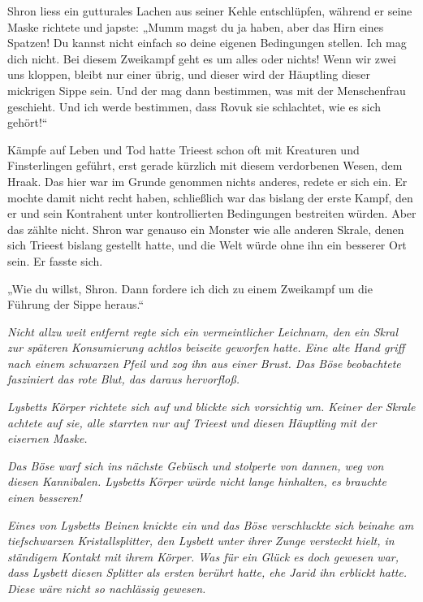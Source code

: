 Shron liess ein gutturales Lachen aus seiner Kehle entschlüpfen, während er seine Maske richtete und japste: „Mumm magst du ja haben, aber das Hirn eines Spatzen! Du kannst nicht einfach so deine eigenen Bedingungen stellen. Ich mag dich nicht. Bei diesem Zweikampf geht es um alles oder nichts! Wenn wir zwei uns kloppen, bleibt nur einer übrig, und dieser wird der Häuptling dieser mickrigen Sippe sein. Und der mag dann bestimmen, was mit der Menschenfrau geschieht. Und ich werde bestimmen, dass Rovuk sie schlachtet, wie es sich gehört!“

Kämpfe auf Leben und Tod hatte Trieest schon oft mit Kreaturen und Finsterlingen geführt, erst gerade kürzlich mit diesem verdorbenen Wesen, dem Hraak. Das hier war im Grunde genommen nichts anderes, redete er sich ein. Er mochte damit nicht recht haben, schließlich war das bislang der erste Kampf, den er und sein Kontrahent unter kontrollierten Bedingungen bestreiten würden. Aber das zählte nicht. Shron war genauso ein Monster wie alle anderen Skrale, denen sich Trieest bislang gestellt hatte, und die Welt würde ohne ihn ein besserer Ort sein. Er fasste sich.

„Wie du willst, Shron. Dann fordere ich dich zu einem Zweikampf um die Führung der Sippe heraus.“



\trennzeichen



\textit{Nicht allzu weit entfernt regte sich ein vermeintlicher Leichnam, den ein Skral zur späteren Konsumierung achtlos beiseite geworfen hatte. Eine alte Hand griff nach einem schwarzen Pfeil und zog ihn aus einer Brust. Das Böse beobachtete fasziniert das rote Blut, das daraus hervorfloß.}

\textit{Lysbetts Körper richtete sich auf und blickte sich vorsichtig um. Keiner der Skrale achtete auf sie, alle starrten nur auf Trieest und diesen Häuptling mit der eisernen Maske.}

\textit{Das Böse warf sich ins nächste Gebüsch und stolperte von dannen, weg von diesen Kannibalen. Lysbetts Körper würde nicht lange hinhalten, es brauchte einen besseren!}

\textit{Eines von Lysbetts Beinen knickte ein und das Böse verschluckte sich beinahe am tiefschwarzen Kristallsplitter, den Lysbett unter ihrer Zunge versteckt hielt, in ständigem Kontakt mit ihrem Körper. Was für ein Glück es doch gewesen war, dass Lysbett diesen Splitter als ersten berührt hatte, ehe Jarid ihn erblickt hatte. Diese wäre nicht so nachlässig gewesen.}

